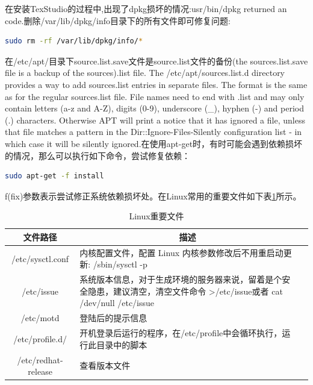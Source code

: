 \documentclass[12pt]{book}
\numberwithin{dummy}{section}
\theoremstyle{ocrenumbox}
\theoremstyle{blacknumex}
\theoremstyle{blacknumbox}
\theoremstyle{ocrenum}
\begin{document}
在安装TexStudio的过程中,出现了dpkg损坏的情况:usr/bin/dpkg returned an code.删除/var/lib/dpkg/info目录下的所有文件即可修复问题:

\begin{lstlisting}[language=Bash]
sudo rm -rf /var/lib/dpkg/info/*
\end{lstlisting}

在/etc/apt/目录下source.list.save文件是source.list文件的备份(the sources.list.save file is a backup of the sources).list file. The /etc/apt/sources.list.d directory provides a way to add sources.list entries in separate files. The format is the same as for the regular sources.list file. File names need to end with .list and may only contain letters (a-z and A-Z), digits (0-9), underscore (\_), hyphen (-) and period (.) characters. Otherwise APT will print a notice that it has ignored a file, unless that file matches a pattern in the Dir::Ignore-Files-Silently configuration list - in which case it will be silently ignored.在使用apt-get时，有时可能会遇到依赖损坏的情况，那么可以执行如下命令，尝试修复依赖：

\begin{lstlisting}[language=Bash]
sudo apt-get -f install 
\end{lstlisting}

f(fix)参数表示尝试修正系统依赖损坏处。在Linux常用的重要文件如下表\ref{table:linuxconfigfile}所示。


\begin{table}
	\caption{Linux重要文件}
	\label{table:linuxconfigfile}
	\begin{center}
		\begin{tabular}{cp{10cm}c}
			\hline
			\multirow{1}{*}{文件路径}
			& \multicolumn{1}{c}{描述}  \\
			\hline			
			/etc/sysctl.conf  & 内核配置文件，配置 Linux 内核参数修改后不用重启动更新: /sbin/sysctl -p \\
			/etc/issue  & 系统版本信息，对于生成环境的服务器来说，留着是个安全隐患，建议清空，清空文件命令 >/etc/issue或者 cat /dev/null /etc/issue \\
			/etc/motd & 登陆后的提示信息\\
			/etc/profile.d/ & 开机登录后运行的程序，在/etc/profile中会循环执行，运行此目录中的脚本\\
			/etc/redhat-release & 查看版本文件\\
			\hline
		\end{tabular}	
	\end{center}
\end{table}
\end{document}
